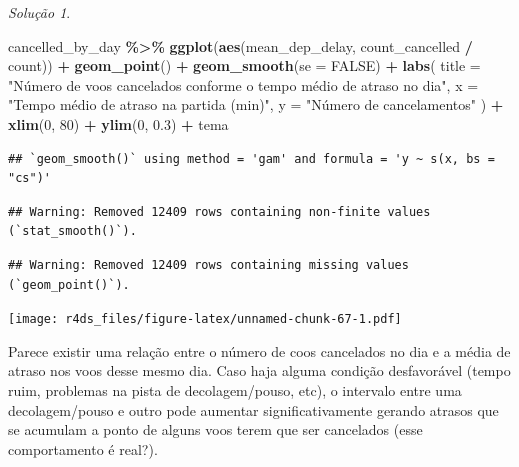 \documentclass[
]{latex/krantz}
\newenvironment{Shaded}{\begin{snugshade}}{\end{snugshade}}
\newcommand{\AttributeTok}[1]{\textcolor[rgb]{0.13,0.29,0.53}{#1}}
\newcommand{\ConstantTok}[1]{\textcolor[rgb]{0.56,0.35,0.01}{#1}}
\newcommand{\DecValTok}[1]{\textcolor[rgb]{0.00,0.00,0.81}{#1}}
\newcommand{\FloatTok}[1]{\textcolor[rgb]{0.00,0.00,0.81}{#1}}
\newcommand{\FunctionTok}[1]{\textcolor[rgb]{0.13,0.29,0.53}{\textbf{#1}}}
\newcommand{\NormalTok}[1]{#1}
\newcommand{\SpecialCharTok}[1]{\textcolor[rgb]{0.81,0.36,0.00}{\textbf{#1}}}
\newcommand{\StringTok}[1]{\textcolor[rgb]{0.31,0.60,0.02}{#1}}
\theoremstyle{definition}
\theoremstyle{definition}
\theoremstyle{definition}
\theoremstyle{definition}
\theoremstyle{remark}
\newtheorem*{solution}{Solução}
\begin{document}
\begin{solution}
\begin{Shaded}
\begin{Highlighting}[]
\NormalTok{cancelled\_by\_day }\SpecialCharTok{\%\textgreater{}\%}
    \FunctionTok{ggplot}\NormalTok{(}\FunctionTok{aes}\NormalTok{(mean\_dep\_delay, count\_cancelled }\SpecialCharTok{/}\NormalTok{ count)) }\SpecialCharTok{+}
        \FunctionTok{geom\_point}\NormalTok{() }\SpecialCharTok{+}
        \FunctionTok{geom\_smooth}\NormalTok{(}\AttributeTok{se =} \ConstantTok{FALSE}\NormalTok{) }\SpecialCharTok{+}
        \FunctionTok{labs}\NormalTok{(}
            \AttributeTok{title =} \StringTok{"Número de voos cancelados conforme o tempo médio de atraso no dia"}\NormalTok{,}
            \AttributeTok{x =} \StringTok{"Tempo médio de atraso na partida (min)"}\NormalTok{,}
            \AttributeTok{y =} \StringTok{"Número de cancelamentos"}
\NormalTok{        ) }\SpecialCharTok{+}
        \FunctionTok{xlim}\NormalTok{(}\DecValTok{0}\NormalTok{, }\DecValTok{80}\NormalTok{) }\SpecialCharTok{+}
        \FunctionTok{ylim}\NormalTok{(}\DecValTok{0}\NormalTok{, }\FloatTok{0.3}\NormalTok{) }\SpecialCharTok{+}
\NormalTok{        tema}
\end{Highlighting}
\end{Shaded}

\begin{verbatim}
## `geom_smooth()` using method = 'gam' and formula = 'y ~ s(x, bs = "cs")'
\end{verbatim}

\begin{verbatim}
## Warning: Removed 12409 rows containing non-finite values (`stat_smooth()`).
\end{verbatim}

\begin{verbatim}
## Warning: Removed 12409 rows containing missing values (`geom_point()`).
\end{verbatim}

\texttt{[image: r4ds\_files/figure-latex/unnamed-chunk-67-1.pdf]}

Parece existir uma relação entre o número de coos cancelados no dia e a média de atraso nos voos desse mesmo dia. Caso haja alguma condição desfavorável (tempo ruim, problemas na pista de decolagem/pouso, etc), o intervalo entre uma decolagem/pouso e outro pode aumentar significativamente gerando atrasos que se acumulam a ponto de alguns voos terem que ser cancelados (esse comportamento é real?).

\end{solution}
\end{document}
